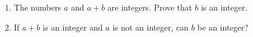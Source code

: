 \begin{enumerate}
\item[(a)] The numbers $a$ and $a+b$ are integers. Prove that $b$ is an integer.
\item[(b)] If $a+b$ is an integer and $a$ is not an integer, can $b$ be an integer?
\end{enumerate}
